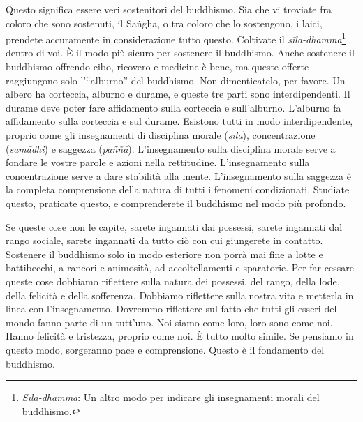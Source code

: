 Questo significa essere veri sostenitori del buddhismo. Sia che vi
troviate fra coloro che sono sostenuti, il Saṅgha, o tra coloro che lo
sostengono, i laici, prendete accuramente in considerazione tutto
questo. Coltivate il \emph{sīla-dhamma}\footnote{\emph{Sīla-dhamma}: Un
  altro modo per indicare gli insegnamenti morali del buddhismo.} dentro
di voi. È il modo più sicuro per sostenere il buddhismo. Anche sostenere
il buddhismo offrendo cibo, ricovero e medicine è bene, ma queste
offerte raggiungono solo l'``alburno'' del buddhismo. Non dimenticatelo,
per favore. Un albero ha corteccia, alburno e durame, e queste tre parti
sono interdipendenti. Il durame deve poter fare affidamento sulla
corteccia e sull'alburno. L'alburno fa affidamento sulla corteccia e sul
durame. Esistono tutti in modo interdipendente, proprio come gli
insegnamenti di disciplina morale (\emph{sīla}), concentrazione
(\emph{samādhi}) e saggezza (\emph{paññā}). L'insegnamento sulla
disciplina morale serve a fondare le vostre parole e azioni nella
rettitudine. L'insegnamento sulla concentrazione serve a dare stabilità
alla mente. L'insegnamento sulla saggezza è la completa comprensione
della natura di tutti i fenomeni condizionati. Studiate questo,
praticate questo, e comprenderete il buddhismo nel modo più profondo.

Se queste cose non le capite, sarete ingannati dai possessi, sarete
ingannati dal rango sociale, sarete ingannati da tutto ciò con cui
giungerete in contatto. Sostenere il buddhismo solo in modo esteriore
non porrà mai fine a lotte e battibecchi, a rancori e animosità, ad
accoltellamenti e sparatorie. Per far cessare queste cose dobbiamo
riflettere sulla natura dei possessi, del rango, della lode, della
felicità e della sofferenza. Dobbiamo riflettere sulla nostra vita e
metterla in linea con l'insegnamento. Dovremmo riflettere sul fatto che
tutti gli esseri del mondo fanno parte di un tutt'uno. Noi siamo come
loro, loro sono come noi. Hanno felicità e tristezza, proprio come noi.
È tutto molto simile. Se pensiamo in questo modo, sorgeranno pace e
comprensione. Questo è il fondamento del buddhismo.

